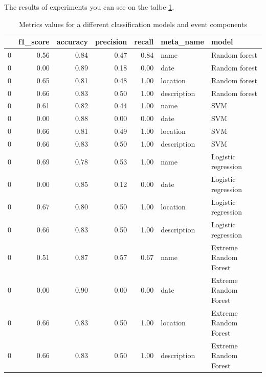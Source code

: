 The results of experiments you can see on the talbe \ref{table:sumresult}.
\begin{table}[h]
\begin{center}
{\renewcommand{\arraystretch}{1.2}
\begin{tabular}{lrrrrll}
\toprule
{} &  f1\_score &  accuracy &  precision &  recall &    meta\_name &                  model \\
\midrule
0 &      0.56 &           0.84 &       0.47 &    0.84 &         name &          Random forest \\
0 &      0.00 &           0.89 &       0.18 &    0.00 &         date &          Random forest \\
0 &      0.65 &           0.81 &       0.48 &    1.00 &     location &          Random forest \\
0 &      0.66 &           0.83 &       0.50 &    1.00 &  description &          Random forest \\
0 &      0.61 &           0.82 &       0.44 &    1.00 &         name &                    SVM \\
0 &      0.00 &           0.88 &       0.00 &    0.00 &         date &                    SVM \\
0 &      0.66 &           0.81 &       0.49 &    1.00 &     location &                    SVM \\
0 &      0.66 &           0.83 &       0.50 &    1.00 &  description &                    SVM \\
0 &      0.69 &           0.78 &       0.53 &    1.00 &         name &    Logistic regression \\
0 &      0.00 &           0.85 &       0.12 &    0.00 &         date &    Logistic regression \\
0 &      0.67 &           0.80 &       0.50 &    1.00 &     location &    Logistic regression \\
0 &      0.66 &           0.83 &       0.50 &    1.00 &  description &    Logistic regression \\
0 &      0.51 &           0.87 &       0.57 &    0.67 &         name &  Extreme Random Forest \\
0 &      0.00 &           0.90 &       0.00 &    0.00 &         date &  Extreme Random Forest \\
0 &      0.66 &           0.83 &       0.50 &    1.00 &     location &  Extreme Random Forest \\
0 &      0.66 &           0.83 &       0.50 &    1.00 &  description &  Extreme Random Forest \\
\bottomrule
\end{tabular}}
\caption{Metrics values for a different classification models and event components}
\label{table:sumresult}
\end{center}
\end{table}  \\  